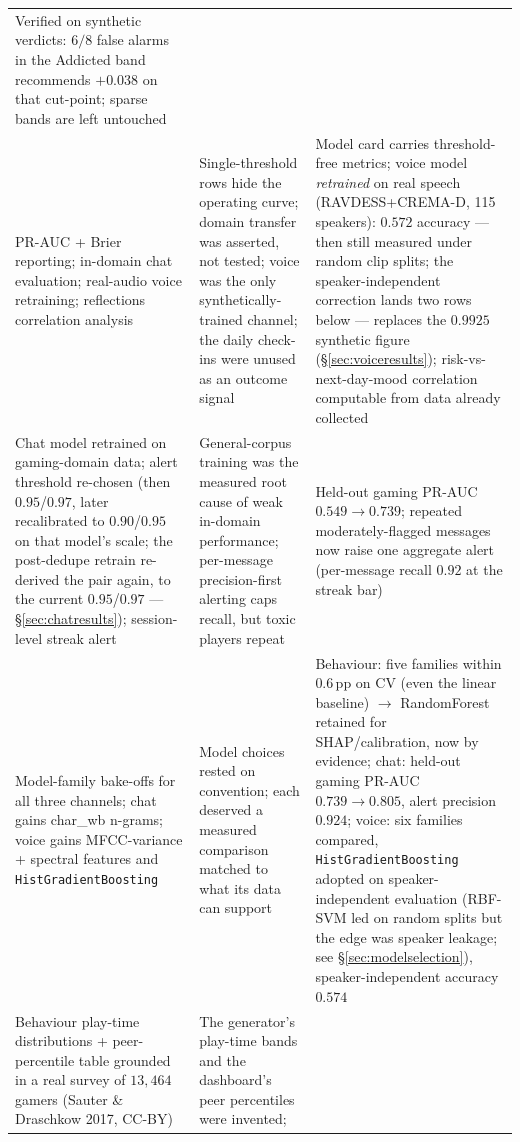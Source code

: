 \documentclass[11pt,a4paper]{article}
\begin{document}
\begin{xltabular}{\linewidth}{p{3.1cm}XX}
Verified on synthetic verdicts: $6/8$ false alarms in the Addicted band recommends
$+0.038$ on that cut-point; sparse bands are left untouched \\
\addlinespace
PR-AUC + Brier reporting; in-domain chat evaluation; real-audio voice retraining;
reflections correlation analysis &
Single-threshold rows hide the operating curve; domain transfer was asserted, not
tested; voice was the only synthetically-trained channel; the daily check-ins were
unused as an outcome signal &
Model card carries threshold-free metrics; voice model \emph{retrained} on real
speech (RAVDESS+CREMA-D, 115 speakers): $0.572$ accuracy --- then still measured
under random clip splits; the speaker-independent correction lands two rows below
--- replaces the $0.9925$
synthetic figure (\S\ref{sec:voiceresults}); risk-vs-next-day-mood correlation
computable from data already collected \\
\addlinespace
Chat model retrained on gaming-domain data; alert threshold re-chosen (then
$0.95$/$0.97$, later recalibrated to $0.90$/$0.95$ on that model's scale; the
post-dedupe retrain re-derived the pair again, to the current $0.95$/$0.97$ ---
\S\ref{sec:chatresults}); session-level streak alert &
General-corpus training was the measured root cause of weak in-domain performance;
per-message precision-first alerting caps recall, but toxic players repeat &
Held-out gaming PR-AUC $0.549 \rightarrow 0.739$; repeated moderately-flagged messages now
raise one aggregate alert (per-message recall $0.92$ at the streak bar) \\
\addlinespace
Model-family bake-offs for all three channels; chat gains char\_wb n-grams; voice
gains MFCC-variance + spectral features and \texttt{HistGradientBoosting} &
Model choices rested on convention; each deserved a measured comparison matched to
what its data can support &
Behaviour: five families within $0.6$\,pp on CV (even the linear baseline) $\rightarrow$
RandomForest retained for SHAP/calibration, now by evidence; chat: held-out gaming
PR-AUC $0.739 \rightarrow 0.805$, alert precision $0.924$; voice: six families
compared, \texttt{HistGradientBoosting} adopted on speaker-independent evaluation
(RBF-SVM led on random splits but the edge was speaker leakage; see
\S\ref{sec:modelselection}), speaker-independent accuracy $0.574$ \\
\addlinespace
Behaviour play-time distributions + peer-percentile table grounded in a real survey
of $13{,}464$ gamers (Sauter \& Draschkow 2017, CC-BY) &
The generator's play-time bands and the dashboard's peer percentiles were invented;

\end{xltabular}
\end{document}
